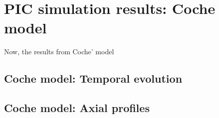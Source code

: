 
\section{PIC simulation results: Coche model}

Now, the results from Coche' model

\subsection{Coche model: Temporal evolution} \label{subsec-temp_coche}




\subsection{Coche model: Axial profiles} \label{subsec-axial_coche}

